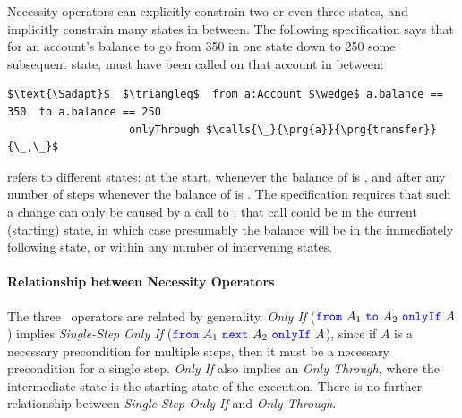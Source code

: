 \label{sec:adapt:motivate}
\noindent Necessity operators can explicitly constrain two or even three states,
and implicitly constrain many states in between. The following 
 specification  \Sadapt 
 says that for an account's balance to go  
 from 350 in one state down to 250 some subsequent state, 
  must have been called on that account in between:
%
\begin{lstlisting}[language = Chainmail, mathescape=true, frame=lines]
$\text{\Sadapt}$  $\triangleq$  from a:Account $\wedge$ a.balance == 350  to a.balance == 250
                   onlyThrough $\calls{\_}{\prg{a}}{\prg{transfer}}{\_,\_}$
\end{lstlisting}
%
\Sadapt  refers to  different states: at 
the start,  whenever the balance of  is , and after any number of steps
whenever the balance of  is . The specification requires
that such a change can only be caused by a call to  :
that call could be in the current (starting) state,
  in which case
 presumably the balance will be  in the immediately following state,
or within any number of intervening states.



\paragraph{Relationship between Necessity Operators}
The three \Nec \ operators
are related by generality. 
 \emph{Only If} (${\color{blue}\texttt{from}}\ A_1\ {\color{blue}\texttt{to}}\ A_2\ {\color{blue}\texttt{onlyIf}}\ A$) implies
  \emph{Single-Step Only If} (${\color{blue}\texttt{from}}\ A_1\ {\color{blue}\texttt{next}}\ A_2\ {\color{blue}\texttt{onlyIf}}\ A$), since if $A$ is 
a necessary precondition for multiple steps, then it must be a necessary 
precondition for a single step. 
 \emph{Only If} also implies 
an \emph{Only Through}, where the intermediate state is the starting state
of the execution.  There is no further relationship between 
\emph{Single-Step Only If} and \emph{Only Through}.


